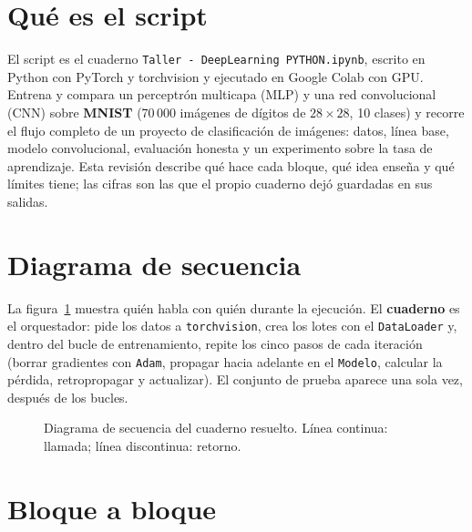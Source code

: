 \documentclass[11pt,letterpaper]{article}
\begin{document}
\UDportada

\section{Qué es el script}

El script es el cuaderno \texttt{Taller - DeepLearning PYTHON.ipynb}, escrito en Python con PyTorch y torchvision y ejecutado en Google Colab con GPU.
Entrena y compara un perceptrón multicapa (MLP) y una red convolucional (CNN) sobre \textbf{MNIST} (70\,000 imágenes de dígitos de $28\times28$, 10 clases) y recorre el
flujo completo de un proyecto de clasificación de imágenes: datos, línea base, modelo convolucional, evaluación honesta y un experimento sobre la tasa de aprendizaje.
Esta revisión describe qué hace cada bloque, qué idea enseña y qué límites tiene; las cifras son las que el propio cuaderno dejó guardadas en sus salidas.


\section{Diagrama de secuencia}

La figura~\ref{fig:secuencia} muestra quién habla con quién durante la ejecución. El \textbf{cuaderno} es el orquestador: pide los datos a \texttt{torchvision}, crea los lotes con el
\texttt{DataLoader} y, dentro del bucle de entrenamiento, repite los cinco pasos de cada iteración (borrar gradientes con \texttt{Adam}, propagar hacia adelante en el \texttt{Modelo},
calcular la pérdida, retropropagar y actualizar). El conjunto de prueba aparece una sola vez, después de los bucles.

\begin{figure}[H]
\centering

\caption{Diagrama de secuencia del cuaderno resuelto. Línea continua: llamada; línea discontinua: retorno.}\label{fig:secuencia}
\end{figure}

\section{Bloque a bloque}
\end{document}
